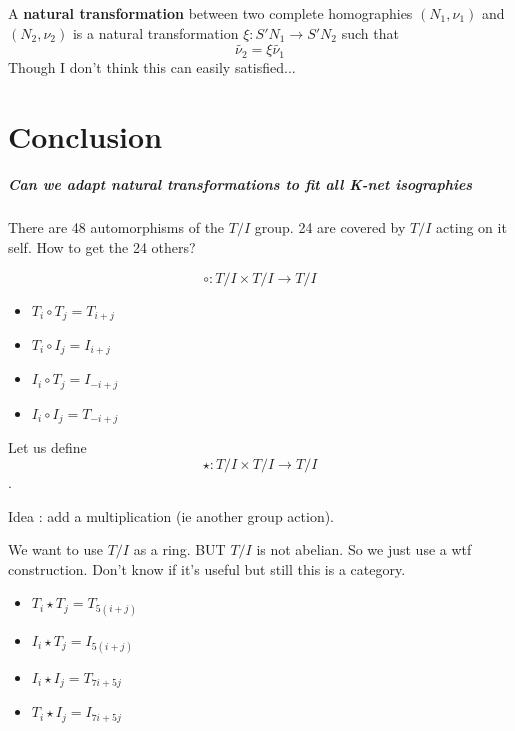 \documentclass{report}
\begin{document}
\begin{defn}
    A \textbf{natural transformation} between two complete homographies $(N_1,\nu_1)$ and $(N_2,\nu_2)$ is a natural transformation $\xi : S'N_1\rightarrow S'N_2$ such that
    \begin{equation}
        \widetilde{\nu_2}= \xi\widetilde{\nu_1}
    \end{equation}
    Though I don't think this can easily satisfied...
\end{defn}







\chapter{Conclusion}

\paragraph{Can we adapt natural transformations to fit all K-net isographies}
There are 48 automorphisms of the $T/I$ group. 24 are covered by $T/I$ acting on it self. How to get the 24 others?

$$\circ : T/I \times T/I \rightarrow T/I$$

\begin{itemize}
    \item $T_i \circ T_j = T_{i + j}$
    \item $T_i \circ I_j = I_{i + j}$
    \item $I_i \circ T_j = I_{-i + j}$
    \item $I_i \circ I_j = T_{-i + j}$
\end{itemize}

Let us define
$$\star : T/I \times T/I \rightarrow T/I$$.

Idea : add a multiplication (ie another group action).

We want to use $T/I$ as a ring. BUT $T/I$ is not abelian. So we just use a wtf construction. Don't know if it's useful but still this is a category.
\begin{itemize}
    \item $T_i \star T_j = T_{5(i + j)}$
    \item $I_i \star T_j = I_{5(i + j)}$
    \item $I_i \star I_j = T_{7i + 5j}$
    \item $T_i \star I_j = I_{7i + 5j}$
\end{itemize}
\end{document}
